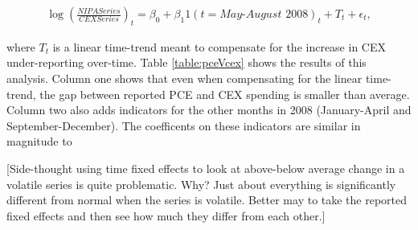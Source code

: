 \begin{align}
    \log \left( \frac{NIPA Series}{CEX Series}   \right)_t = \beta_0 + \beta_1 1(t = \textit{May-August 2008})_t + T_t + \epsilon_t,
\end{align}

where $T_t$ is a linear time-trend meant to compensate for the increase in CEX under-reporting over-time. Table \ref{table:pceVcex}
shows the results of this analysis. Column one shows that even when compensating for the linear time-trend, the gap 
between reported PCE and CEX spending is smaller than average. Column two also adds indicators for the other months
in 2008 (January-April and September-December). The coefficents on these indicators are similar in magnitude to 


[Side-thought using time fixed effects to look at above-below average change in a volatile series is quite problematic.
Why? Just about everything is significantly different from normal when the series is volatile. Better may to take the 
reported fixed effects and then see how much they differ from each other.]


